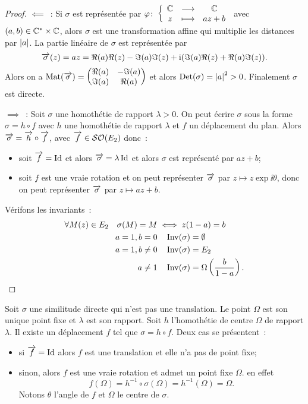 \begin{proof}
  $\impliedby$~: Si $\sigma$ est représentée par $\varphi\colon \left\{\begin{array}{ccc} \mathbb{C} & \longrightarrow &\mathbb{C}\\ z & \longmapsto & az+b \end{array} \right.$ avec $(a,b) \in \mathbb{C}^* \times \mathbb{C}$, alors $\sigma$ est une transformation affine qui multiplie les distances par $\left\lvert a\right\rvert$. La partie linéaire de $\sigma$ est représentée par
  \begin{equation}
    \overrightarrow{\sigma}(z) = az = \Re(a)\Re(z) -\Im(a)\Im(z) +\operatorname{i}(\Im(a)\Re(z)+\Re(a)\Im(z)).
  \end{equation}
  Alors on a $\mathrm{Mat}(\overrightarrow{\sigma}) = \begin{pmatrix} \Re(a) & -\Im(a) \\ \Im(a) & \Re(a) \end{pmatrix}$ et alors $\operatorname{Det}(\sigma)=\left\lvert a\right\rvert^2>0$. Finalement $\sigma$ est directe.

    $\implies$~: Soit $\sigma$ une homothétie de rapport $\lambda>0$. On peut écrire $\sigma$ sous la forme $\sigma=h \circ f$ avec $h$ une homothétie de rapport $\lambda$ et $f$ un déplacement du plan. Alors $\overrightarrow{\sigma}=\overrightarrow{h} \circ \overrightarrow{f}$, avec $\overrightarrow{f}\in \mathcal{SO}\!\left(E_2\right)$ donc~:
    \begin{itemize}
    \item soit $\overrightarrow{f}=\operatorname{Id}$ et alors $\overrightarrow{\sigma}=\lambda \operatorname{Id}$ et alors $\sigma$ est représenté par $az+b$;
    \item soit $f$ est une vraie rotation et on peut représenter $\overrightarrow{\sigma}$ par $z \longmapsto z\exp{\ii \theta}$, donc on peut représenter $\overrightarrow{\sigma}$ par $z \longmapsto az+b$.
    \end{itemize}

    Vérifons les invariants~:
    \begin{align}
      \forall M(z) \in E_2 \quad \sigma(M) = M &\iff z(1-a)=b \\
      a=1, b=0 &\quad \operatorname{Inv}(\sigma)=\emptyset\\
      a=1, b\neq 0 &\quad \operatorname{Inv}(\sigma)=E_2 \\
      a\neq 1 &\quad \operatorname{Inv}(\sigma) = \Omega\left(\frac{b}{1-a}\right).
    \end{align}
\end{proof}
Soit $\sigma$ une similitude directe qui n'est pas une translation. Le point $\Omega$ est son unique point fixe et $\lambda$ est son rapport. Soit $h$ l'homothétie de centre $\Omega$ de rapport $\lambda$. Il existe un déplacement $f$ tel que $\sigma = h \circ f$. Deux cas se présentent~:
\begin{itemize}
\item si $\overrightarrow{f}=\operatorname{Id}$ alors $f$ est une translation et elle n'a pas de point fixe;
\item sinon, alors $f$ est une vraie rotation et admet un point fixe $\Omega$. en effet
  \begin{equation}
    f(\Omega) = h^{-1}\circ \sigma(\Omega) = h^{-1}(\Omega) = \Omega.
  \end{equation}
  Notons $\theta$ l'angle  de $f$ et $\Omega$ le centre de $\sigma$. 
\end{itemize}


